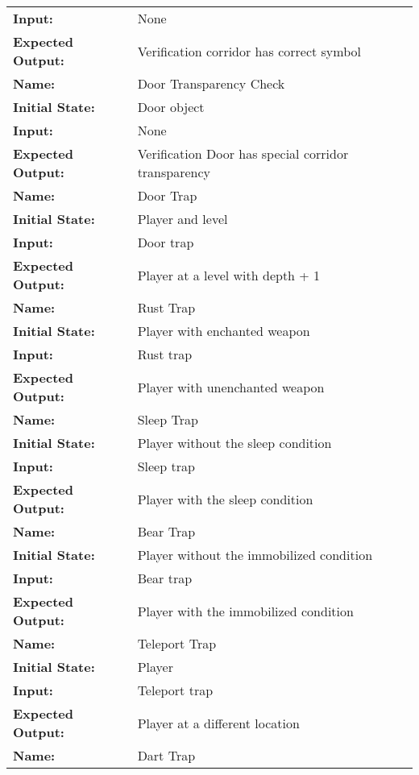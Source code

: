 \documentclass[12pt, titlepage]{article}
\begin{document}
\begin{center}
\begin{longtable}{ l | p{10cm} }
				\textbf{Input:} & None\\
				\textbf{Expected Output:} & Verification corridor has correct symbol\\[1em]
				\hline
				\rule{0pt}{2em}\textbf{Name:} & Door Transparency Check\\
				\textbf{Initial State:} & Door object\\
				\textbf{Input:} & None\\
				\textbf{Expected Output:} & Verification Door has special corridor transparency\\[1em]
				\hline
				\rule{0pt}{2em}\textbf{Name:} & Door Trap\\
				\textbf{Initial State:} & Player and level\\
				\textbf{Input:} & Door trap\\
				\textbf{Expected Output:} & Player at a level with depth + 1\\[1em]
				\hline
				\rule{0pt}{2em}\textbf{Name:} & Rust Trap\\
				\textbf{Initial State:} & Player with enchanted weapon\\
				\textbf{Input:} & Rust trap\\
				\textbf{Expected Output:} & Player with unenchanted weapon\\[1em]
				\hline
				\rule{0pt}{2em}\textbf{Name:} & Sleep Trap\\
				\textbf{Initial State:} & Player without the sleep condition\\
				\textbf{Input:} & Sleep trap\\
				\textbf{Expected Output:} & Player with the sleep condition\\[1em]
				\hline
				\rule{0pt}{2em}\textbf{Name:} & Bear Trap\\
				\textbf{Initial State:} & Player without the immobilized condition\\
				\textbf{Input:} & Bear trap\\
				\textbf{Expected Output:} & Player with the immobilized condition\\[1em]
				\hline
				\rule{0pt}{2em}\textbf{Name:} & Teleport Trap\\
				\textbf{Initial State:} & Player\\
				\textbf{Input:} & Teleport trap\\
				\textbf{Expected Output:} & Player at a different location\\[1em]
				\hline
				\rule{0pt}{2em}\textbf{Name:} & Dart Trap\\

\end{longtable}
\end{center}
\end{document}
